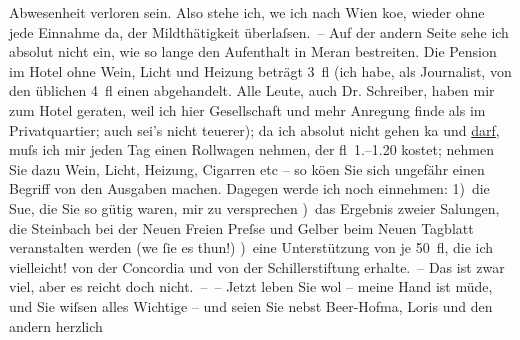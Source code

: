 {\begin{ledgroupsized}[t]{13cm}
                    Abwesenheit verloren sein. Also stehe ich, we{\geminationn} ich
                    nach Wien ko{\geminationm}e,
                    wieder ohne jede Einnahme da, der Mildthätigkeit überlaſsen. – Auf der andern
                    Seite sehe ich absolut nicht ein, wie so lange den Aufenthalt in Meran bestreiten. Die Pension im Hotel ohne
                    Wein, Licht und Heizung beträgt 3 fl (ich habe, als Journalist, von den üblichen
                    4 fl einen abgehandelt. Alle Leute, auch Dr. Schreiber, haben mir zum Hotel geraten, weil ich hier Gesellschaft und
                    mehr Anregung finde als im Privatquartier; auch sei’s nicht teuerer); da ich
                    absolut nicht gehen ka{\geminationn} und \uline{darf}, muſs ich mir jeden Tag einen Rollwagen nehmen, der
                    fl 1.–1.20 kostet; nehmen Sie dazu Wein, Licht, Heizung, Cigarren etc – so kö{\geminationn}en Sie sich ungefähr einen Begriff von den
                    Ausgaben machen. Dagegen werde ich noch einnehmen: \pend
           \pstart
           {\pb}1) die Su{\geminationm}e,
                    die Sie so gütig waren, mir zu versprechen\pend
           ) das Ergebnis zweier Sa{\geminationm}lungen, die Steinbach bei der Neuen Freien Preſse und Gelber beim Neuen Tagblatt
                    veranstalten werden (we{\geminationn}{ }ſie es thun!)\pend
           ) eine Unterstützung von je 50 fl, die ich vielleicht! von der Concordia und von der Schillerstiftung erhalte. – Das ist zwar viel, aber es reicht doch
                    nicht. – –\pend
           \pstart
           Jetzt leben Sie wol – meine Hand ist müde, und Sie wiſsen alles Wichtige – und
                    seien Sie nebst Beer-Hofma{\geminationn}, Loris und den andern herzlich

\end{ledgroupsized}}
